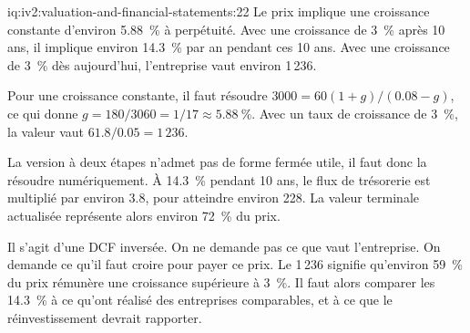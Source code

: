 \begin{solution}{iq:iv2:valuation-and-financial-statements:22}
Le prix implique une croissance constante d'environ 5.88~\% à perpétuité. Avec une croissance de 3~\% après 10 ans, il implique environ 14.3~\% par an pendant ces 10 ans. Avec une croissance de 3~\% dès aujourd'hui, l'entreprise vaut environ 1\,236.

Pour une croissance constante, il faut résoudre $3000 = 60(1 + g)/(0.08 - g)$, ce qui donne $g = 180/3060 = 1/17 \approx 5.88~\%$. Avec un taux de croissance de 3~\%, la valeur vaut $61.8/0.05 = 1\,236$.

La version à deux étapes n'admet pas de forme fermée utile, il faut donc la résoudre numériquement. À 14.3~\% pendant 10 ans, le flux de trésorerie est multiplié par environ 3.8, pour atteindre environ 228. La valeur terminale actualisée représente alors environ 72~\% du prix.

Il s'agit d'une DCF inversée. On ne demande pas ce que vaut l'entreprise. On demande ce qu'il faut croire pour payer ce prix. Le 1\,236 signifie qu'environ 59~\% du prix rémunère une croissance supérieure à 3~\%. Il faut alors comparer les 14.3~\% à ce qu'ont réalisé des entreprises comparables, et à ce que le réinvestissement devrait rapporter.

\end{solution}

